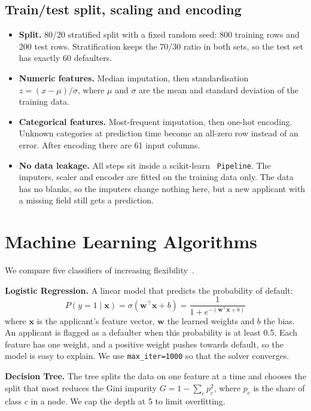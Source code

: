 \documentclass[11pt,a4paper]{article}
\begin{document}
\subsection{Train/test split, scaling and encoding}

\begin{itemize}
  \item \textbf{Split.} 80/20 stratified split with a fixed random seed: 800 training rows and 200 test rows. Stratification keeps the 70/30 ratio in both sets, so the test set has exactly 60 defaulters.
  \item \textbf{Numeric features.} Median imputation, then standardisation $z = (x - \mu)/\sigma$, where $\mu$ and $\sigma$ are the mean and standard deviation of the training data.
  \item \textbf{Categorical features.} Most-frequent imputation, then one-hot encoding. Unknown categories at prediction time become an all-zero row instead of an error. After encoding there are 61 input columns.
  \item \textbf{No data leakage.} All steps sit inside a scikit-learn~\cite{sklearn} \texttt{Pipeline}. The imputers, scaler and encoder are fitted on the training data only. The data has no blanks, so the imputers change nothing here, but a new applicant with a missing field still gets a prediction.
\end{itemize}

\section{Machine Learning Algorithms}

We compare five classifiers of increasing flexibility~\cite{mitchell,alpaydin}.

\textbf{Logistic Regression.} A linear model that predicts the probability of default:
\begin{equation}
  P(y=1 \mid \mathbf{x}) = \sigma(\mathbf{w}^\top\mathbf{x} + b) = \frac{1}{1 + e^{-(\mathbf{w}^\top\mathbf{x} + b)}}
\end{equation}
where $\mathbf{x}$ is the applicant's feature vector, $\mathbf{w}$ the learned weights and $b$ the bias. An applicant is flagged as a defaulter when this probability is at least 0.5. Each feature has one weight, and a positive weight pushes towards default, so the model is easy to explain. We use \texttt{max\_iter=1000} so that the solver converges.

\textbf{Decision Tree.} The tree splits the data on one feature at a time and chooses the split that most reduces the Gini impurity $G = 1 - \sum_c p_c^2$, where $p_c$ is the share of class $c$ in a node. We cap the depth at 5 to limit overfitting.
\end{document}
